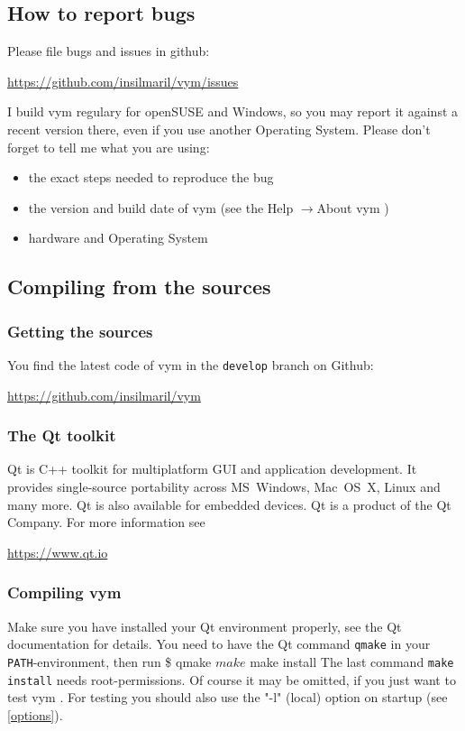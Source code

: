 \documentclass[12pt,a4paper]{article}
\newcommand{\vym}{{\sc vym }}
\newcommand{\ra}{$\longrightarrow$}
\newenvironment{code}[1] { \verbatim #1}{\endverbatim  }
\begin{document}
\begin{appendix}
\subsection{How to report bugs}
Please file bugs and issues in github: 
\begin{center}
    \href{ https://github.com/insilmaril/vym/issues}{https://github.com/insilmaril/vym/issues}
\end{center}

I build \vym regulary for openSUSE and Windows, so you may report it against a
recent version there, even if you  use another Operating System.
Please don't forget to tell me what you are using:
\begin{itemize}
    \item the exact steps needed to reproduce the bug
    \item the version and build date of \vym (see the Help \ra About
    \vym)
    \item hardware and Operating System
\end{itemize}

\subsection{Compiling from the sources}
\subsubsection{Getting the sources} \label{getsources}
You find the latest code of \vym in the {\tt develop} branch on Github:
\begin{center}
    \href{ https://github.com/insilmaril/vym}{https://github.com/insilmaril/vym}
\end{center}

\subsubsection{The Qt toolkit}
Qt is C++ toolkit for multiplatform GUI and application development. It
provides single-source portability across MS~Windows, Mac~OS~X, Linux
and many more. Qt is also available for
embedded devices. Qt is a product of the Qt Company. For more information see
\begin{center} 
    \href{https://www.qt.io}{https://www.qt.io} 
\end{center}



\subsubsection{Compiling \vym }
Make sure you have installed your Qt environment properly, see the Qt
documentation for details. You need to have the Qt command {\tt qmake}
in your {\tt PATH}-environment, then run
\begin{code}
\$ qmake
$ make  
$ make install
\end{code}
The last command {\tt make install} needs root-permissions. Of course it
may be omitted, if you just want to test \vym. For testing you should
also use the "-l" (local) option on startup (see \ref{options}).


\end{appendix}
\end{document}
